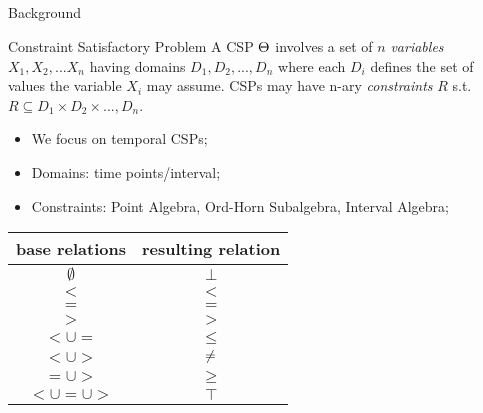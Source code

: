 \documentclass[utf8, a4paper]{beamer}
\begin{document}
\subsection{}
\begin{frame}{Background}
	\begin{block}{Constraint Satisfactory Problem}%
		A CSP $\csp{}$ involves a set of $n$ \textit{variables} $X_1, X_2, ... X_n$ having domains $D_1, D_2, ..., D_n$ where each $D_i$ defines the set of values the variable $X_i$ may assume. CSPs may have n-ary \textit{constraints} $R$ s.t. $R \subseteq D_1 \times D_2 \times ..., D_n$. 
	\end{block}
	
	\begin{itemize}
		\item We focus on temporal CSPs;
		\item Domains: time points/interval;
		\item Constraints: Point Algebra, Ord-Horn Subalgebra, Interval Algebra;
	\end{itemize}
	
	\begin{table}
		\centering
		\begin{tabular}{c|c}
			\textbf{base relations}		&	\textbf{resulting relation} \\ \hline
			$\emptyset$			&	$\bot$	\\
			$<$					&	$<$		\\
			$=$					&	$=$		\\
			$>$					&	$>$		\\
			$< \cup =$			&	$\leq$	\\
			$< \cup >$			&	$\noteq$\\
			$= \cup >$			&	$\geq$	\\
			$< \cup = \cup >$	&	$\top$	\\
		\end{tabular}
	\end{table}
\end{frame}
\end{document}
